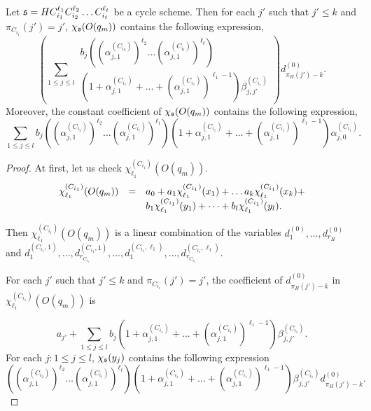 \begin{appendix}
\begin{proposition}
Let ${\mathfrak{s} }=HC_{i_1}^{\ell_1} C_{i_2}^{\ell_2} \dots C_{i_t}^{\ell_t}$ be a cycle scheme. Then for each $j'$ such that $j' \le k$ and $\pi_{C_{i_1}}(j')=j'$, $\chi_{{\mathfrak{s} }}(O(q_m))$ contains the following expression,
\[
\left(\sum \limits_{1 \le j \le l} 
\begin{array}{l}
b_j \left((\alpha^{(C_{i_2})}_{j,1})^{\ell_2} \dots (\alpha^{(C_{i_t})}_{j,1})^{\ell_t}\right) \\
\left(1+\alpha^{(C_{i_1})}_{j,1} + \dots + (\alpha^{(C_{i_1})}_{j,1})^{\ell_1-1} \right) \beta^{(C_{i_1})}_{j,j'}
\end{array}
\right) d^{(0)}_{\pi_H(j')-k}. 
\]
Moreover, the constant coefficient of $\chi_{\mathfrak{s} }(O(q_m))$ contains the following expression,
\[
\sum \limits_{1 \le j \le l} 
b_j \left((\alpha^{(C_{i_2})}_{j,1})^{\ell_2} \dots (\alpha^{(C_{i_t})}_{j,1})^{\ell_t}\right) 
\left(1+\alpha^{(C_{i_1})}_{j,1} + \dots + (\alpha^{(C_{i_1})}_{j,1})^{\ell_1-1} \right) \alpha^{(C_{i_1})}_{j,0}.
\]
\end{proposition}

\begin{proof}
At first,  let us check $\chi^{(C_{i_1})}_{\ell_1}(O(q_m))$.
\[
\begin{array}{l c l}
\chi^{(C_{i_1})}_{\ell_1}(O(q_m)) & = & a_0 + a_1 \chi^{(C_{i_1})}_{\ell_1}(x_1) + \dots a_k \chi^{(C_{i_1})}_{\ell_1}(x_k) + \\
& & b_1 \chi^{(C_{i_1})}_{\ell_1}(y_1) + \dots + b_l \chi^{(C_{i_1})}_{\ell_1}(y_l).
\end{array}
\] 

Then $\chi^{(C_{i_1})}_{\ell_1}(O(q_m))$ is a linear combination of the variables $d^{(0)}_1,\dots, d^{(0)}_{r_H}$ and $d^{(C_{i_1},1)}_1,\dots, d^{(C_{i_1},1)}_{r_{C_{i_1}}}, \dots, d^{(C_{i_1},\ell_1)}_1,\dots, d^{(C_{i_1},\ell_1)}_{r_{C_{i_1}}}$.

For each $j'$ such that $j' \le k$ and $\pi_{C_{i_1}}(j')=j'$, the coefficient of $d^{(0)}_{\pi_H(j')-k}$ in $\chi^{(C_{i_1})}_{\ell_1}(O(q_m))$ is 

\[a_{j'} + \sum \limits_{1 \le j \le l} b_j \left(1+\alpha^{(C_{i_1})}_{j,1} + \dots + (\alpha^{(C_{i_1})}_{j,1})^{\ell_1-1} \right) \beta^{(C_{i_1})}_{j,j'}.\]
%
%
For each $j: 1 \le j \le l$, $\chi_{{\mathfrak{s} }}(y_j)$ contains the following expression 
\[\left((\alpha^{(C_{i_2})}_{j,1})^{\ell_2} \dots (\alpha^{(C_{i_t})}_{j,1})^{\ell_t}\right)\left(1+\alpha^{(C_{i_1})}_{j,1} + \dots + (\alpha^{(C_{i_1})}_{j,1})^{\ell_1-1} \right) \beta^{(C_{i_1})}_{j,j'} d^{(0)}_{\pi_H(j')-k}.\]


\end{proof}
\end{appendix}
